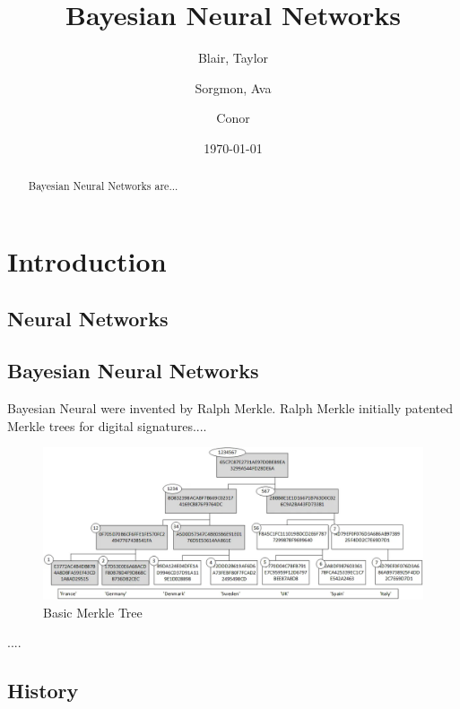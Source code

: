 \documentclass[12pt]{article}
\title{Bayesian Neural Networks}
\author{
	Blair, Taylor
	\and
	Sorgmon, Ava
	\and
	Conor
}
\date{\today}
\begin{document}
\doublespacing
\maketitle



\begin{abstract}
	Bayesian Neural Networks are...
\end{abstract}

\tableofcontents

\section{Introduction}

\subsection{Neural Networks}


\subsection{Bayesian Neural Networks}

Bayesian Neural were invented by Ralph Merkle. Ralph Merkle initially patented Merkle trees for digital signatures....

\begin{figure}[H]
	\centering
	\includegraphics[width=.8\textwidth]{../Images/merkle-example.png}
	\caption{Basic Merkle Tree\cite{wikipedia-merkle-tree}}
\end{figure}


....


\subsection{History}
\end{document}
